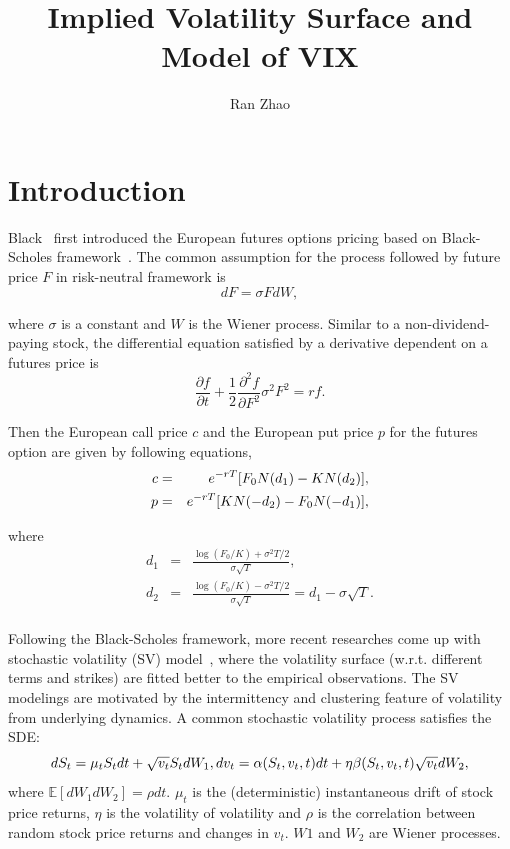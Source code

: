 \documentclass[11pt,reqno,final]{amsart}
\title{Implied Volatility Surface and Model of VIX}
\author{Ran Zhao}
\begin{document}
\begin{abstract}

\end{abstract}

\maketitle
%
%
%
\section{Introduction}
Black~\cite{Black76} first introduced the European futures options pricing based on Black-Scholes framework~\cite{BS73}. The common assumption for the process followed by future price $F$ in risk-neutral framework is
\begin{equation}
dF=\sigma F dW,
\end{equation}

where $\sigma$ is a constant and $W$ is the Wiener process. Similar to a non-dividend-paying stock, the differential equation satisfied by a derivative dependent on a futures price is
$$
\frac{\partial f}{\partial t} + \frac{1}{2} \frac{\partial^2 f}{\partial F^2} \sigma^2 F^2 = rf.
$$

Then the European call price $c$ and the European put price $p$ for the futures option are given by following equations,
\begin{eqnarray}
c &=& e^{-rT}[F_0 N(d_1) - KN(d_2)],  \label{eqn::future_bs} \\
p &=& e^{-rT}[K N(-d_2) - F_0 N(-d_1)], \notag \\
\end{eqnarray}

where
\begin{eqnarray*}
d_1 &=& \frac{\log(F_0/K) + \sigma^2T/2}{\sigma\sqrt{T}}, \\
d_2 &=& \frac{\log(F_0/K) - \sigma^2T/2}{\sigma\sqrt{T}} = d_1 -\sigma\sqrt{T}. \\
\end{eqnarray*}

Following the Black-Scholes framework, more recent researches come up with stochastic volatility (SV) model~\cite{Heston93,Bates96,DPS00}, where the volatility surface (w.r.t. different terms and strikes) are fitted better to the empirical observations. The SV modelings are motivated by the intermittency and clustering feature of volatility from underlying dynamics. A common stochastic volatility process satisfies the SDE:
\begin{equation*}
dS_t = \mu_t S_t dt + \sqrt{v_t} S_t dW_1, \\
dv_t = \alpha(S_t,v_t,t)dt + \eta\beta(S_t,v_t,t)\sqrt{v_t} dW_2,
\end{equation*}
where $\mathbb{E}[dW_1 dW_2]=\rho dt$. $\mu_t$ is the (deterministic) instantaneous drift of stock price returns, $\eta$ is the volatility of volatility and $\rho$ is the correlation between random stock price returns and changes in $v_t$. $W1$ and $W_2$ are Wiener processes.
\end{document}
